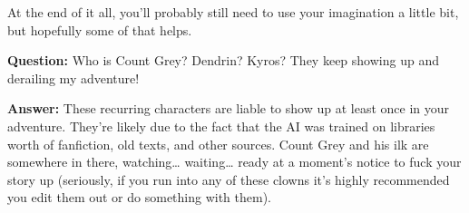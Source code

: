 \documentclass[Avsfag-main.tex]{subfiles}
\begin{document}
At the end of it all, you'll probably still need to use your imagination
a little bit, but hopefully some of that helps.\smallskip

\textbf{Question:} Who is Count Grey? Dendrin? Kyros? They keep showing
up and derailing my adventure!

\textbf{Answer:} These recurring characters are liable to show up at
least once in your adventure. They're likely due to the fact that the AI
was trained on libraries worth of fanfiction, old texts, and other
sources. Count Grey and his ilk are somewhere in there, watching…
waiting… ready at a moment's notice to fuck your story up
(seriously, if you run into any of these clowns it's highly recommended
you edit them out or do something with them).

\nocite{*}
\clearpage
{}
\printbibliography[title={Resources},subtype=writing]
\label{ch:resources}
\clearpage

\end{document}
